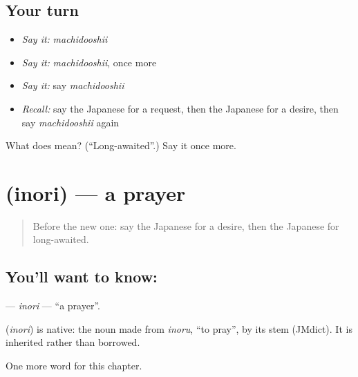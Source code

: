 \subsection*{Your turn}
\begin{itemize}
\raggedright
  \item \emph{Say it:} \emph{machidooshii}
  \item \emph{Say it:} \emph{machidooshii}, once more
  \item \emph{Say it:} say \emph{machidooshii}
  \item \emph{Recall:} say the Japanese for a request, then the Japanese for a desire, then say \emph{machidooshii} again
\end{itemize}

\begin{tcolorbox}[breakable,colback=teal!4,colframe=teal!35!black,title={Before you move on}]
What does  mean? (\textquotedblleft{}Long-awaited\textquotedblright{}.) Say it once more.
\end{tcolorbox}
\section[\texorpdfstring{\ja{いのり} (inori)}{いのり (inori)}]{ (inori) — a prayer}

\label{lesson:JA-C93-inori}



\begin{quote}
Before the new one: say the Japanese for a desire, then the Japanese for long-awaited.
\end{quote}

\subsection*{You'll want to know: }
\textbf{} — \emph{inori} — \textquotedblleft{}a prayer\textquotedblright{}.

\begin{cousinweb}
\textbf{} (\emph{inori}) is native: the noun made from \emph{inoru}, \textquotedblleft{}to pray\textquotedblright{}, by its stem (JMdict). It is inherited rather than borrowed.
\end{cousinweb}

\begin{grammarlens}[title={What you've built}]
One more word for this chapter.
\end{grammarlens}

